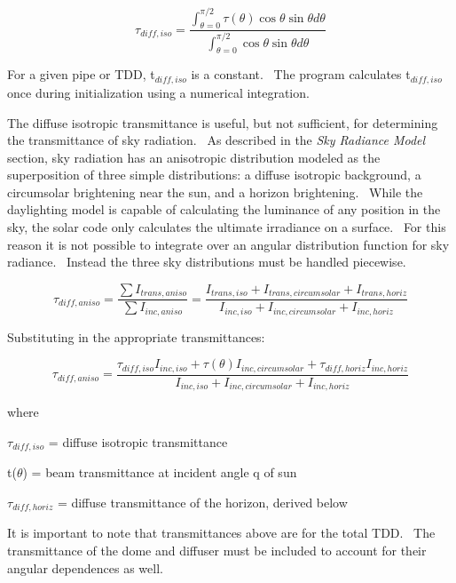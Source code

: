 \begin{equation}
{\tau_{diff,iso}} = \frac{{\int_{\theta  = 0}^{\pi /2} {\tau (\theta )\cos \theta } \sin \theta d\theta }}{{\int_{\theta  = 0}^{\pi /2} {\cos \theta } \sin \theta d\theta }}
\end{equation}

For a given pipe or TDD, t\(_{diff,iso}\) is a constant.~ The program calculates t\(_{diff,iso}\) once during initialization using a numerical integration.

The diffuse isotropic transmittance is useful, but not sufficient, for determining the transmittance of sky radiation.~ As described in the \emph{Sky Radiance Model} section, sky radiation has an anisotropic distribution modeled as the superposition of three simple distributions: a diffuse isotropic background, a circumsolar brightening near the sun, and a horizon brightening.~ While the daylighting model is capable of calculating the luminance of any position in the sky, the solar code only calculates the ultimate irradiance on a surface.~ For this reason it is not possible to integrate over an angular distribution function for sky radiance.~ Instead the three sky distributions must be handled piecewise.

\begin{equation}
{\tau_{diff,aniso}} = \frac{{\sum {{I_{trans,aniso}}} }}{{\sum {{I_{inc,aniso}}} }} = \frac{{{I_{trans,iso}} + {I_{trans,circumsolar}} + {I_{trans,horiz}}}}{{{I_{inc,iso}} + {I_{inc,circumsolar}} + {I_{inc,horiz}}}}
\end{equation}

Substituting in the appropriate transmittances:

\begin{equation}
{\tau_{diff,aniso}} = \frac{{{\tau_{diff,iso}}{I_{inc,iso}} + \tau (\theta ){I_{inc,circumsolar}} + {\tau_{diff,horiz}}{I_{inc,horiz}}}}{{{I_{inc,iso}} + {I_{inc,circumsolar}} + {I_{inc,horiz}}}}
\end{equation}

where

\(\tau_{diff,iso}\) = diffuse isotropic transmittance

t(\(\theta\)) = beam transmittance at incident angle q of sun

\(\tau_{diff,horiz}\) = diffuse transmittance of the horizon, derived below

It is important to note that transmittances above are for the total TDD.~ The transmittance of the dome and diffuser must be included to account for their angular dependences as well.

